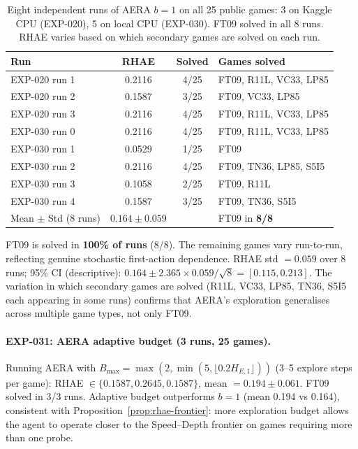 \documentclass[11pt]{article}
\begin{document}
\begin{table}[h]
\centering
\caption{Eight independent runs of AERA $b{=}1$ on all 25 public games: 3 on Kaggle CPU (EXP-020), 5 on local CPU (EXP-030). FT09 solved in all 8 runs. RHAE varies based on which secondary games are solved on each run.}
\label{tab:multiseed}
\begin{tabular}{lccl}
\toprule
Run & RHAE & Solved & Games solved \\
\midrule
EXP-020 run 1 & 0.2116 & 4/25 & FT09, R11L, VC33, LP85 \\
EXP-020 run 2 & 0.1587 & 3/25 & FT09, VC33, LP85 \\
EXP-020 run 3 & 0.2116 & 4/25 & FT09, R11L, VC33, LP85 \\
EXP-030 run 0 & 0.2116 & 4/25 & FT09, R11L, VC33, LP85 \\
EXP-030 run 1 & 0.0529 & 1/25 & FT09 \\
EXP-030 run 2 & 0.2116 & 4/25 & FT09, TN36, LP85, S5I5 \\
EXP-030 run 3 & 0.1058 & 2/25 & FT09, R11L \\
EXP-030 run 4 & 0.1587 & 3/25 & FT09, TN36, S5I5 \\
\midrule
Mean $\pm$ Std (8 runs) & $0.164 \pm 0.059$ & & FT09 in \textbf{8/8} \\
\bottomrule
\end{tabular}
\end{table}

FT09 is solved in \textbf{100\% of runs} (8/8). The remaining games vary run-to-run, reflecting genuine stochastic first-action dependence. RHAE std $= 0.059$ over 8 runs; 95\% CI (descriptive): $0.164 \pm 2.365 \times 0.059/\sqrt{8} = [0.115, 0.213]$. The variation in which secondary games are solved (R11L, VC33, LP85, TN36, S5I5 each appearing in some runs) confirms that AERA's exploration generalises across multiple game types, not only FT09.

\paragraph{EXP-031: AERA adaptive budget (3 runs, 25 games).} Running AERA with $B_{\max} = \max(2, \min(5, \lfloor 0.2 H_{E,1} \rfloor))$ (3--5 explore steps per game): RHAE $\in \{0.1587, 0.2645, 0.1587\}$, mean $= 0.194 \pm 0.061$. FT09 solved in 3/3 runs. Adaptive budget outperforms $b{=}1$ (mean 0.194 vs 0.164), consistent with Proposition~\ref{prop:rhae-frontier}: more exploration budget allows the agent to operate closer to the Speed--Depth frontier on games requiring more than one probe.
\end{document}

